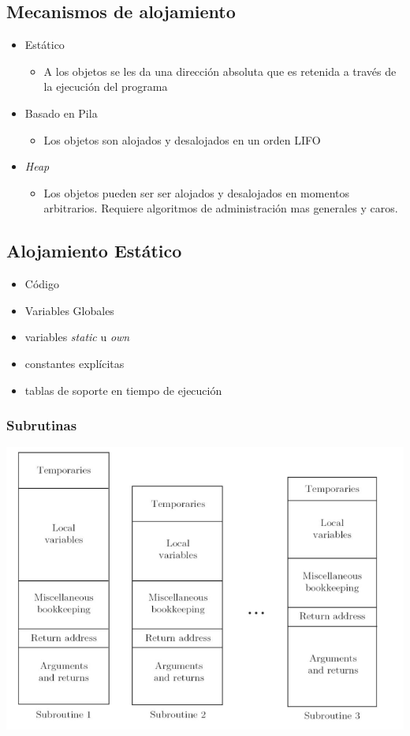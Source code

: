 \documentclass[11pt]{article}
\begin{document}
\subsection*{Mecanismos de alojamiento}
\label{sec:org89151a4}
\begin{itemize}
\item Estático
\begin{itemize}
\item A los objetos se les da una dirección absoluta que es retenida a
través de la ejecución del programa
\end{itemize}
\item Basado en Pila
\begin{itemize}
\item Los objetos son alojados y desalojados en un orden LIFO
\end{itemize}
\item \emph{Heap}
\begin{itemize}
\item Los objetos pueden ser ser alojados y desalojados en momentos
arbitrarios. Requiere algoritmos de administración mas generales y caros.
\end{itemize}
\end{itemize}

\subsection*{Alojamiento Estático}
\label{sec:orgfb9366c}
\begin{itemize}
\item Código
\item Variables Globales
\item variables \emph{static} u \emph{own}
\item constantes explícitas
\item tablas de soporte en tiempo de ejecución
\end{itemize}

\subsubsection*{Subrutinas}
\label{sec:orgace0ed5}
\begin{center}
\includegraphics[width=.9\linewidth]{aljamestaticosub.png}
\end{center}
\end{document}
